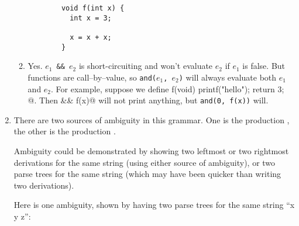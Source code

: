 \documentclass[11pt]{article}
\begin{document}
\begin{enumerate}
\begin{enumerate}
                  \begin{center}

                    \begin{BVerbatim}
        void f(int x) {
          int x = 3;

          x = x + x;
        }
                    \end{BVerbatim}

                  \end{center}


            \item Yes.  \texttt{$e_1$ \&\& $e_2$} is short-circuiting and
                  won't evaluate $e_2$ if $e_1$ is false.  But functions are
                  call--by--value, so \texttt{and($e_1$, $e_2$)} will always
                  evaluate both $e_1$ and $e_2$.  For example, suppose we
                  define \verb@int f(void) { printf("hello"); return 3; }@.
                  Then  && f(x)@ will not print anything, but
                  \texttt{and(0, f(x))} will.

          \end{enumerate}

    \item %
          There are two sources of ambiguity in this grammar.  One is the
          production , the other is the production
          .

                  Ambiguity could be demonstrated by showing two leftmost or
                  two rightmost derivations for the same string (using
                  either source of ambiguity), or two parse trees for the
                  same string (which may have been quicker than writing two
                  derivations).

                  Here is one ambiguity, shown by having two parse trees
                  for the same string ``x y z'':

                  \vspace{-2mm}

                  \begin{multicols}{2}

                    \begin{center}


\end{center}
\end{multicols}
\end{enumerate}
\end{document}
